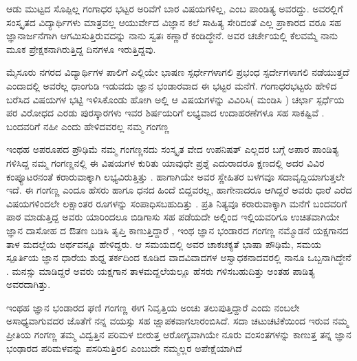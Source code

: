{ಆಡು ಮುಟ್ಟದ ಸೊಪ್ಪಿಲ್ಲ ಗಂಗಾಧರ ಭಟ್ಟರ ಅರಿವೆಗೆ ಬಾರ ವಿಷಯಗಳಿಲ್ಲ, ಎಂಬ ಪಾಂಡಿತ್ಯ ಅವರದ್ದು.  ಅವರಲ್ಲಿಗೆ ಸಂಸ್ಕೃತದ ವಿದ್ಯಾರ್ಥಿಗಳು ಮಾತ್ರವಲ್ಲ  ಆಯುರ್ವೇದ ವಿಜ್ಞಾನ ಕಲೆ ಸಾಹಿತ್ಯ ಸೇರಿದಂತೆ  ಎಲ್ಲ ಪ್ರಾಕಾರದ ವರೂ ಸಹ ಜ್ಞಾನಾರ್ಜನೆಗಾಗಿ ಆಗಮಿಸುತ್ತಿರುವದನ್ನು ನಾನು ಸ್ವತಃ ಕಣ್ಣಾರೆ  ಕಂಡಿದ್ಧೇನೆ. ಅವರ ಚರ್ಚೇಯಲ್ಲಿ ಕೆಲವಮ್ಮೆ ನಾನು  ಮೂಕ ಪ್ರೇಕ್ಷಕನಾಗಿರುತ್ತಿದ್ದ ದಿನಗಳೂ ಇರುತ್ತಿದ್ದವು.

ಮೈಸೂರು ನಗರದ ವಿದ್ಯಾರ್ಥಿಗಳ ಪಾಲಿಗೆ ಎಲ್ಲಿಯೇ ಭಾಷಣ ಸ್ಪರ್ಧೇಗಳಾಗಲಿ  ಪ್ರಭಂಧ ಸ್ಪರ್ದೇಗಳಾಗಲಿ  ನಡೆಯುತ್ತದೆ ಎಂದಾದಲ್ಲಿ   ಅವರೆಲ್ಲ ಧಾಂಗುಡಿ ಇಡುವದು ಜ್ಞಾನ ಭಂಡಾರವಾದ ಈ ಭಟ್ಟರ ಮನೆಗೆ.  ಗಂಗಾಧರಭಟ್ಟರು ಹೇಳಿದ  ಬರೆಸಿದ ವಿಷಯಗಳ ಭಟ್ಟಿ ಇಳಿಸಿಕೊಂಡು ಹೋಗಿ   ಅಲ್ಲಿ ಆ ವಿಷಯಗಳನ್ನು ವಿವಿರಿಸಿ( ಮಂಡಿಸಿ )   ಚರ್ಛಾ ಸ್ಪರ್ಧೆಯ ಪರ ವಿರೋಧದ ಎರಡು ಪುರಸ್ಕಾರಗಳು ಇವರ ಶಿರ್ಷಯರಿಗೆ ಲಭ್ಯವಾದ ಉದಾಹರಣೆಗಳೂ ಸಹ ಸಾಕಷ್ಟಿವೆ . ಬಂದವರಿಗೆ ನಹೀ ಎಂದು ಹೇಳಿದವರಲ್ಲ ನಮ್ಮ ಗಂಗಣ್ಣ  

ಇಂಥಹ ಅಪರೂಪದ ಪ್ರೌಢಿಮೆ ನಮ್ಮ ಗಂಗಣ್ಣನದು  ಸಂಸ್ಕೃತ ವೇದ ಉಪನಿಷತ್ ಎಲ್ಲದರ ಬಗ್ಗೆ ಅಪಾರ ಪಾಂಡಿತ್ಯ ಗಳಿಸಿದ್ದ ನಮ್ಮ ಗಂಗಣ್ಣನಲ್ಲಿ ಈ ವಿಷಯಗಳ ಕುರಿತು ಯಾವುಧೇ ಪ್ರಶ್ನೆ ಎದುರಾದರೂ ಕ್ಷಣದಲ್ಲಿ ಅದರ ವಿವಿರ ಕಂಪ್ಯೂಟರನಂತೆ ಕರಾರುವಾಕ್ಕಾಗಿ ಲಭ್ಯವಿರುತ್ತಿತ್ತು . ಹಾಗಾಗಿಯೇ ಅವರ ಸ್ಣೇಹಿತರ ಬಳಗವೂ ಸದಾವೃದ್ದಿಯಾಗುತ್ತಲೇ ಇದೆ.  ಈ ಗಂಗಣ್ಣ ಎಂದೂ ಹೆಸರು ಹಾಗೂ ಧನದ ಹಿಂದೆ ಬಿದ್ದವರಲ್ಲ, ಹಾಗೇನಾದರೂ ಆಗಿದ್ದರೆ ಅವರು ಧಾರೆ ಎರೆದ  ವಿಷಯಗಳಿಂದಲೇ  ಲಕ್ಷಾಂತರ ರೂಗಳನ್ನು ಸಂಪಾಧಿಸಬಹುದಿತ್ತು . ಪ್ರತಿ ನಿತ್ಯವೂ ಕರಾರುವಾಕ್ಕಾಗಿ ಮನೆಗೆ ಬಂದವರಿಗೆ ಪಾಠ ಮಾಡುತ್ತಿದ್ದ ಅವರು ಯಾರಿಂದಲೂ ಬಿಡಿಗಾಸು ಸಹ ಪಡೆಯದೇ ಅಲ್ಲಿಂದ ಇಲ್ಲಿಯವರಿಗೂ ಉಚಿತವಾಗಿಯೇ ಜ್ಞಾನ ದಾಸೋಹ ದ ಔತಣ  ಬಡಿಸಿ ತೃಪ್ತಿ ಕಾಣುತ್ತಿದ್ದಾರೆ ,    ಇಂಥ ಜ್ಞಾನ ಭಂಡಾರದ ಗಂಗಣ್ಣ  ನಮ್ಮೊಡನೆ ಯಕ್ಷಗಾನದ ತಾಳ ಮದಲ್ಲೆಯ ಅರ್ಥವನ್ನೂ ಹೇಳಿದ್ದರು.  ಆ ಸಮಯದಲ್ಲಿ ಅವರ ಚಾಕಚಕ್ಯತೆ ಭಾಷಾ ಪೌಢಿಮೆ, ಸಮಯ ಸ್ಪೂರ್ತಿಯ ಜ್ಞಾನ ಧಾರೆಯ ಶುಧ್ದ ತರ್ಕದಿಂದ ಕೂಡಿದ  ವಾದವಿವಾದಗಳ ಆಸ್ವಾಧಕನಾದವರಲ್ಲಿ ನಾನೂ ಒಬ್ಬನಾಗಿದ್ಧೇನೆ . ಮನಸ್ಸು ಮಾಡಿದ್ದರೆ ಅವರು ಯಕ್ಷಗಾನ ತಾಳಮದ್ದಲೆಯಲ್ಲೂ ಹೆಸರು ಗಳಿಸಬಹುದಿತ್ತು ಅಂತಹ ಪಾಡಿತ್ಯ ಅವರದಾಗಿತ್ತು.  

ಇಂಥಹ ಜ್ಞಾನ ಭಂಡಾರದ ಘಣಿ ಗಂಗಣ್ಣ ಈಗ ನಿವೃತ್ತಿಯ ಅಂಚು ತಲುಪುತ್ತಿದ್ದಾರೆ ಎಂದು ನಂಬಲೇ ಅಸಾಧ್ಯವಾಗುವದರ ಜೊತೆಗೆ ನನ್ನ ವಯಸ್ಸು  ಸಹ ಜ್ಷಾಪಕವಾಗಲಾರಂಬಿಸಿದೆ. ಸದಾ ಚಟುಚಟಿಕೆಯಿಂದ ಇರುವ ನಮ್ಮ ಪ್ರೀತಿಯ ಗಂಗಣ್ಣ    ತಮ್ಮ ವಿದ್ವತ್ತಿನ ಪರಿಮಳ ಬೀರುತ್ತ  ಆರೋಗ್ಯವಾಗಿಯೇ  ನೂರು ವಂಸಂತಗಳನ್ನು  ಕಾಣುತ್ತ  ತನ್ನ ಜ್ಞಾನ ಭಂಢಾರದ ಪರಿಮಳವನ್ನು ಪಸರಿಸುತ್ತಿರಲಿ ಎಂಬುದೇ ನಮ್ಮಲ್ಲರ ಅಪೇಕ್ಷೆಯಾಗಿದೆ


\articleend
}
